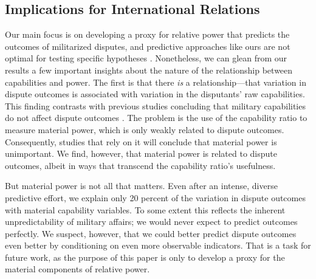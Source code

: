 \subsection{Implications for International Relations}

Our main focus is on developing a proxy for relative power that predicts the outcomes of militarized disputes, and predictive approaches like ours are not optimal for testing specific hypotheses \citep{Shmueli:2010jd}.
Nonetheless, we can glean from our results a few important insights about the nature of the relationship between capabilities and power.
The first is that there \emph{is} a relationship---that variation in dispute outcomes is associated with variation in the disputants' raw capabilities.
This finding contrasts with previous studies concluding that military capabilities do not affect dispute outcomes \citep{Maoz:1983cw}.
The problem is the use of the capability ratio to measure material power, which is only weakly related to dispute outcomes.
Consequently, studies that rely on it will conclude that material power is unimportant.
We find, however, that material power is related to dispute outcomes, albeit in ways that transcend the capability ratio's usefulness.

But material power is not all that matters.
Even after an intense, diverse predictive effort, we explain only 20 percent of the variation in dispute outcomes with material capability variables.
To some extent this reflects the inherent unpredictability of military affairs; we would never expect to predict outcomes perfectly.
We suspect, however, that we could better predict dispute outcomes even better by conditioning on even more observable indicators.
That is a task for future work, as the purpose of this paper is only to develop a proxy for the material components of relative power.

\begin{table}[tp]
  \centering
  
  \caption{%
    Percentage increases in loss, relative to the full ensemble, due to removing each capability component from the analysis.
    The results ``without year'' come from running the super learner on only the 16 component models without the year variable.
  }
  \label{tab:varimp}
\end{table}

